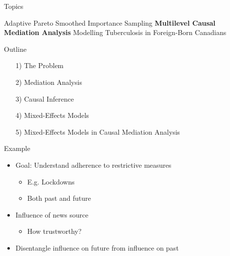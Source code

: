 \documentclass[14pt]{beamer}
\begin{document}
\begin{frame}{Topics}
    \begin{outline}
        \1 Adaptive Pareto Smoothed Importance Sampling \newline
        \1 \textbf{Multilevel Causal Mediation Analysis} \newline
        \1 Modelling Tuberculosis in Foreign-Born Canadians
    \end{outline}
\end{frame}

\begin{frame}{Outline}
    \begin{itemize}
        \setlength{\itemsep}{0.75em}
        \item[1)] The Problem
        \item[2)] Mediation Analysis
        \item[3)] Causal Inference
        \item[4)] Mixed-Effects Models
        \item[5)] Mixed-Effects Models in Causal Mediation Analysis
    \end{itemize}
\end{frame}

\begin{frame}{Example}
    \begin{itemize}
        \item Goal: Understand adherence to restrictive measures
        \begin{itemize}
            \item E.g. Lockdowns
            \item Both past and future \newline
        \end{itemize}
        \item Influence of news source
        \begin{itemize}
            \item How trustworthy? \newline
        \end{itemize}
        \item Disentangle influence on future from influence on past
    \end{itemize}
    
\end{frame}
\end{document}
